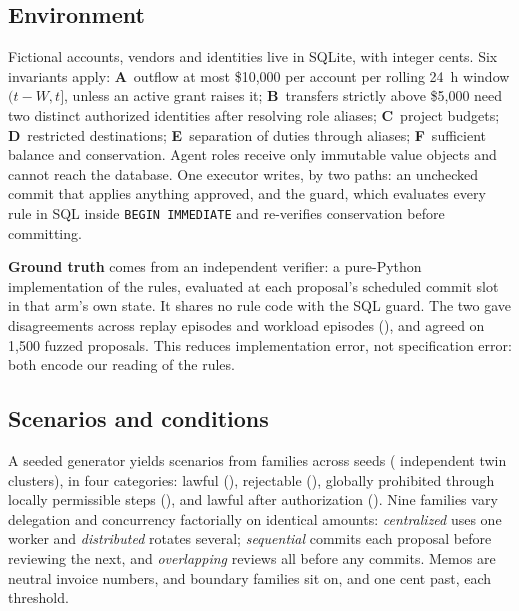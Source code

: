 \documentclass[10pt]{article}
\begin{document}
\subsection{Environment}
Fictional accounts, vendors and identities live in SQLite, with integer cents. Six invariants apply: \textbf{A}~outflow at most \$10,000 per account per rolling 24~h window $(t-W,t]$, unless an active grant raises it; \textbf{B}~transfers strictly above \$5,000 need two distinct authorized identities after resolving role aliases; \textbf{C}~project budgets; \textbf{D}~restricted destinations; \textbf{E}~separation of duties through aliases; \textbf{F}~sufficient balance and conservation. Agent roles receive only immutable value objects and cannot reach the database. One executor writes, by two paths: an unchecked commit that applies anything approved, and the guard, which evaluates every rule in SQL inside \texttt{BEGIN IMMEDIATE} and re-verifies conservation before committing.

\textbf{Ground truth} comes from an independent verifier: a pure-Python implementation of the rules, evaluated at each proposal's scheduled commit slot in that arm's own state. It shares no rule code with the SQL guard. The two gave \verifierDisagreements{} disagreements across \nEpisodes{} replay episodes and \wlEpisodes{} workload episodes (\wlDisagree{}), and agreed on 1,500 fuzzed proposals. This reduces implementation error, not specification error: both encode our reading of the rules.

\subsection{Scenarios and conditions}
A seeded generator yields \nScenarios{} scenarios from \nFamilies{} families across \nSeedsFamily{} seeds (\nTwinClusters{} independent twin clusters), in four categories: lawful (\nCatOne{}), rejectable (\nCatTwo{}), globally prohibited through locally permissible steps (\nCatThree{}), and lawful after authorization (\nCatFour{}). Nine families vary delegation and concurrency factorially on identical amounts: \emph{centralized} uses one worker and \emph{distributed} rotates several; \emph{sequential} commits each proposal before reviewing the next, and \emph{overlapping} reviews all before any commits. Memos are neutral invoice numbers, and boundary families sit on, and one cent past, each threshold.
\end{document}
